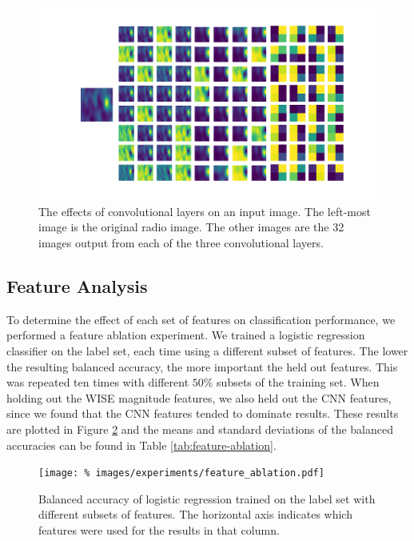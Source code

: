       \begin{figure}[!ht]
        \centering
        \includegraphics[width=\textwidth]{images/rgz_cnn}
        \caption{The effects of convolutional layers on an input image. The
          left-most image is the original radio image. The other images are the
          32 images output from each of the three convolutional layers.}
        \label{fig:rgz-cnn}
      \end{figure}

  \subsection{Feature Analysis}
  \label{sec:feature-analysis}

    To determine the effect of each set of features on classification
    performance, we performed a feature ablation experiment. We trained a
    logistic regression classifier on the \citeauthor{norris06} label set, each
    time using a different subset of features. The lower the resulting balanced
    accuracy, the more important the held out features. This was repeated ten
    times with different $50\%$ subsets of the training set. When holding out
    the WISE magnitude features, we also held out the CNN features, since we
    found that the CNN features tended to dominate results. These results are
    plotted in Figure \ref{fig:feature-ablation} and the means and standard
    deviations of the balanced accuracies can be found in Table
    \ref{tab:feature-ablation}.

    \begin{figure}[!ht]
      \centering
      \texttt{[image: \%
        images/experiments/feature\_ablation.pdf]}
      \caption{Balanced accuracy of logistic regression trained on the
        \citeauthor{norris06} label set with different subsets of features. The
        horizontal axis indicates which features were used for the results in
        that column.}
      \label{fig:feature-ablation}
    \end{figure}

